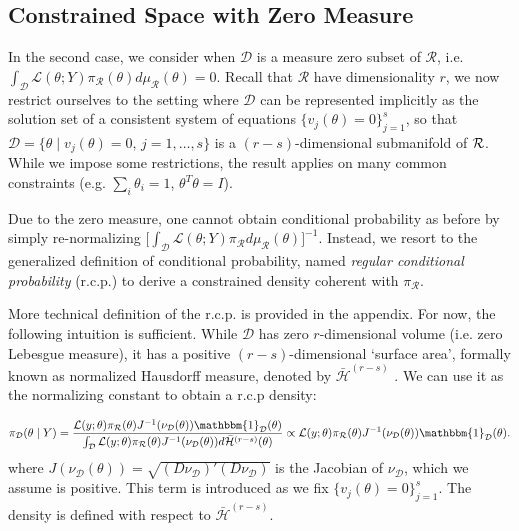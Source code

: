 \documentclass[10pt,fleqn]{article} \pdfoutput=1
\DeclareMathOperator{\1}{\mathbbm{1}} \DeclareMathOperator{\bigO}{\mc O}
\begin{document}
\subsection{Constrained Space with Zero Measure} \label{SEC:Zero_Measure_Methods}

In the second case, we consider when $\mathcal{D}$ is a measure zero subset
of $\mathcal{R}$, i.e.
$\int_\mathcal{D}\mathcal{L}(\theta;Y)\pi_\mathcal{R}(\theta)d\mu_\mathcal{R}(\theta)=0$.
Recall that $\mathcal{R}$ have dimensionality $r$, we now restrict ourselves to the
setting where $\mathcal{D}$ can be represented implicitly as the solution
set of a consistent system of equations $\{v_j(\theta) = 0\}_{j=1}^s$, so
that $\mathcal{D} =\{\theta \mid v_j(\theta) =0, \, j = 1, \dots,s\}$ is a
$(r-s)$-dimensional submanifold of $\mathcal{R}$.  While we impose some
restrictions, the result applies on many
common constraints (e.g.  $\sum_i \theta_i = 1$, $\theta^T\theta=I$).

Due to the zero measure, one cannot obtain
conditional probability as before by simply re-normalizing
$\big[\int_\mathcal{D}\mathcal{L}(\theta;Y)\pi_\mathcal{R}d\mu_\mathcal{R}(\theta)\big]^{-1}.$
Instead, we resort to the generalized definition of conditional probability,
named \emph{regular conditional probability} (r.c.p.)
\citep{kolmogorov1950foundations} to derive a constrained density
coherent with $\pi_\mathcal{R}.$ 

More technical definition of the r.c.p. is provided in the appendix. For now, the
following intuition is sufficient. While $\mathcal{D}$ has zero
$r$-dimensional volume
(i.e. zero Lebesgue measure), it has a positive $(r-s)$-dimensional
`surface area', formally known as normalized Hausdorff measure,
denoted by $\bar{\mathcal{H}}^{(r-s)}$ . We can use
it as the normalizing constant to obtain a r.c.p density:

$$\pi_{\mc D}(\theta \mid Y) = \dfrac{
	{\mathcal{L}(y;\theta)\pi_\mathcal{R}(\theta)}{J^{-1}(\nu_\mathcal{D}(\theta))
		\mathbbm{1}_{\mc D}(\theta)
	}
	} {\int_\mathcal{D}
	{\mathcal{L}(y;\theta)\pi_\mathcal{R}(\theta)}{J^{-1}(\nu_\mathcal{D}(\theta))}
d\bar{\mathcal{H}}^{(r-s)}(\theta)}
\propto 
	{\mathcal{L}(y;\theta)\pi_\mathcal{R}(\theta)}{J^{-1}(\nu_\mathcal{D}(\theta))
		\mathbbm{1}_{\mc D}(\theta)
	}.
	$$ 
where $J(\nu_\mathcal{D}(\theta)) =
	\sqrt{(D\nu_\mathcal{D})'(D\nu_\mathcal{D})}$ is the Jacobian of
	$\nu_\mathcal{D}$, which we assume is positive. This term is
	introduced as we fix $\{v_j(\theta)=0\}_{j=1}^{s}$.
	The density is
	defined with respect to $\bar{\mathcal{H}}^{(r-s)}$.
\end{document}
